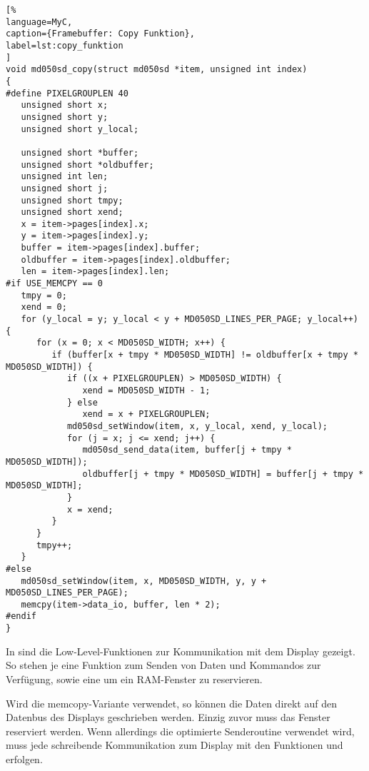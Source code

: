 \begin{lstlisting}[%
language=MyC,
caption={Framebuffer: Copy Funktion},
label=lst:copy_funktion
]
void md050sd_copy(struct md050sd *item, unsigned int index)
{
#define PIXELGROUPLEN 40
   unsigned short x;
   unsigned short y;
   unsigned short y_local;

   unsigned short *buffer;
   unsigned short *oldbuffer;
   unsigned int len;
   unsigned short j;
   unsigned short tmpy;
   unsigned short xend;
   x = item->pages[index].x;
   y = item->pages[index].y;
   buffer = item->pages[index].buffer;
   oldbuffer = item->pages[index].oldbuffer;
   len = item->pages[index].len;
#if USE_MEMCPY == 0
   tmpy = 0;
   xend = 0;
   for (y_local = y; y_local < y + MD050SD_LINES_PER_PAGE; y_local++) {
      for (x = 0; x < MD050SD_WIDTH; x++) {
         if (buffer[x + tmpy * MD050SD_WIDTH] != oldbuffer[x + tmpy * MD050SD_WIDTH]) {
            if ((x + PIXELGROUPLEN) > MD050SD_WIDTH) {
               xend = MD050SD_WIDTH - 1;
            } else
               xend = x + PIXELGROUPLEN;
            md050sd_setWindow(item, x, y_local, xend, y_local);
            for (j = x; j <= xend; j++) {
               md050sd_send_data(item, buffer[j + tmpy * MD050SD_WIDTH]);
               oldbuffer[j + tmpy * MD050SD_WIDTH] = buffer[j + tmpy * MD050SD_WIDTH];
            }
            x = xend;
         }
      }
      tmpy++;
   }
#else
   md050sd_setWindow(item, x, MD050SD_WIDTH, y, y + MD050SD_LINES_PER_PAGE);
   memcpy(item->data_io, buffer, len * 2);
#endif
}
\end{lstlisting}
In  sind die Low-Level-Funktionen zur Kommunikation mit dem Display gezeigt. So stehen je eine Funktion zum Senden von Daten und Kommandos zur Verfügung, sowie eine um ein RAM-Fenster zu reservieren. 

Wird die memcopy-Variante verwendet, so können die Daten direkt auf den Datenbus des Displays geschrieben werden. Einzig zuvor muss das Fenster reserviert werden. Wenn allerdings die optimierte Senderoutine verwendet wird, muss jede schreibende Kommunikation zum Display mit den Funktionen  und  erfolgen. 

